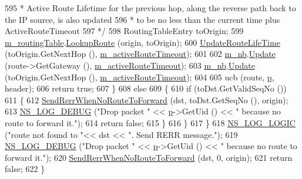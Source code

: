 \begin{DoxyCode}
595 \textcolor{comment}{           *  Active Route Lifetime for the previous hop, along the reverse path back to the IP source, is
       also updated}
596 \textcolor{comment}{           *  to be no less than the current time plus ActiveRouteTimeout}
597 \textcolor{comment}{           */}
598           RoutingTableEntry toOrigin;
599           \hyperlink{classns3_1_1aodv_1_1RoutingProtocol_a4e1003a34c8adc96db71096d88c98ae0}{m\_routingTable}.\hyperlink{classns3_1_1aodv_1_1RoutingTable_a90cbc8a2c65cd68ccdaf768fcbb5d723}{LookupRoute} (origin, toOrigin);
600           \hyperlink{classns3_1_1aodv_1_1RoutingProtocol_a204c68e4ce5aa8dc799f9fd039f8cbc7}{UpdateRouteLifeTime} (toOrigin.GetNextHop (), 
      \hyperlink{classns3_1_1aodv_1_1RoutingProtocol_a37ec921ef1c48e4d8e7072fe989613d2}{m\_activeRouteTimeout});
601 
602           \hyperlink{classns3_1_1aodv_1_1RoutingProtocol_ac1f61cf6b680f2fe8c82983d18bfd3cd}{m\_nb}.\hyperlink{classns3_1_1aodv_1_1Neighbors_a88577f05c06fbff8cf9ed281e9077f6e}{Update} (route->GetGateway (), \hyperlink{classns3_1_1aodv_1_1RoutingProtocol_a37ec921ef1c48e4d8e7072fe989613d2}{m\_activeRouteTimeout});
603           \hyperlink{classns3_1_1aodv_1_1RoutingProtocol_ac1f61cf6b680f2fe8c82983d18bfd3cd}{m\_nb}.\hyperlink{classns3_1_1aodv_1_1Neighbors_a88577f05c06fbff8cf9ed281e9077f6e}{Update} (toOrigin.GetNextHop (), \hyperlink{classns3_1_1aodv_1_1RoutingProtocol_a37ec921ef1c48e4d8e7072fe989613d2}{m\_activeRouteTimeout});
604 
605           ucb (route, \hyperlink{lte__link__budget_8m_ac9de518908a968428863f829398a4e62}{p}, header);
606           \textcolor{keywordflow}{return} \textcolor{keyword}{true};
607         \}
608       \textcolor{keywordflow}{else}
609         \{
610           \textcolor{keywordflow}{if} (toDst.GetValidSeqNo ())
611             \{
612               \hyperlink{classns3_1_1aodv_1_1RoutingProtocol_aa8b4c8c3811348aa19e76218523796af}{SendRerrWhenNoRouteToForward} (dst, toDst.GetSeqNo (), origin);
613               \hyperlink{group__logging_ga413f1886406d49f59a6a0a89b77b4d0a}{NS\_LOG\_DEBUG} (\textcolor{stringliteral}{"Drop packet "} << \hyperlink{lte__link__budget_8m_ac9de518908a968428863f829398a4e62}{p}->GetUid () << \textcolor{stringliteral}{" because no route to forward
       it."});
614               \textcolor{keywordflow}{return} \textcolor{keyword}{false};
615             \}
616         \}
617     \}
618   \hyperlink{group__logging_ga88acd260151caf2db9c0fc84997f45ce}{NS\_LOG\_LOGIC} (\textcolor{stringliteral}{"route not found to "}<< dst << \textcolor{stringliteral}{". Send RERR message."});
619   \hyperlink{group__logging_ga413f1886406d49f59a6a0a89b77b4d0a}{NS\_LOG\_DEBUG} (\textcolor{stringliteral}{"Drop packet "} << \hyperlink{lte__link__budget_8m_ac9de518908a968428863f829398a4e62}{p}->GetUid () << \textcolor{stringliteral}{" because no route to forward it."});
620   \hyperlink{classns3_1_1aodv_1_1RoutingProtocol_aa8b4c8c3811348aa19e76218523796af}{SendRerrWhenNoRouteToForward} (dst, 0, origin);
621   \textcolor{keywordflow}{return} \textcolor{keyword}{false};
622 \}
\end{DoxyCode}


